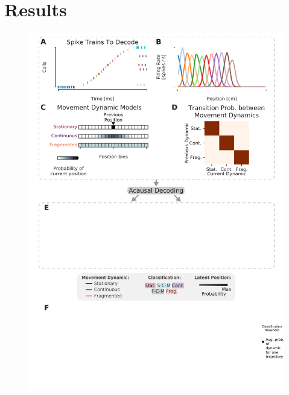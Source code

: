 \documentclass[9pt,lineno]{elife}
\begin{document}
\section*{Results}

\begin{figure}
\includegraphics[width=0.70\linewidth]{figures/Figure1/Figure1_final}

\end{figure}
\end{document}
